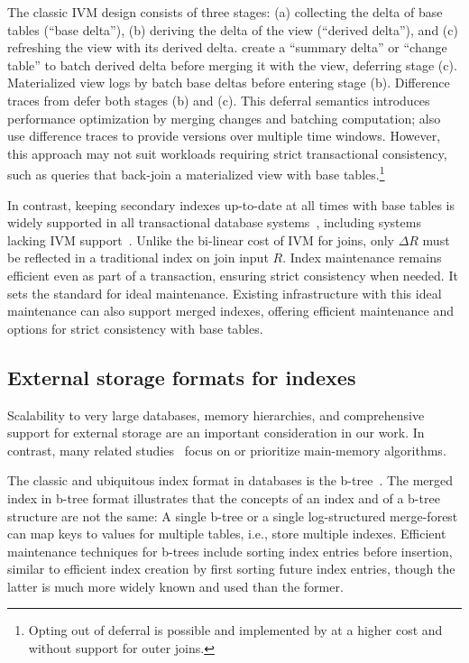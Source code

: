 \documentclass[biblatex, english]{lni}
\begin{document}
The classic IVM design consists of three stages: (a) collecting the delta of base tables (``base delta''), (b) deriving the delta of the view (``derived delta''), and (c) refreshing the view with its derived delta.
 create a ``summary delta'' or ``change table'' to batch derived delta before merging it with the view, deferring stage (c).
Materialized view logs by \citet{oracle2024mvrefresh} batch base deltas before entering stage (b).
Difference traces from \citet{mcsherry2013differentialdataflow} defer both stages (b) and (c).
This deferral semantics introduces performance optimization by merging changes and batching computation; \citet{mcsherry2013differentialdataflow} also use difference traces to provide versions over multiple time windows.
However, this approach may not suit workloads requiring strict transactional consistency, such as queries that back-join a materialized view with base tables.\footnote{
    Opting out of deferral is possible and implemented by \citet{oracle2024mvrefresh} at a higher cost and without support for outer joins.
}

In contrast, keeping secondary indexes up-to-date at all times with base tables is widely supported in all transactional database systems~\cite{oracle2024index, microsoft2024modifyindex}, including systems lacking IVM support~\cite{postgres2024index, ibm2024indexsync}.
Unlike the bi-linear cost of IVM for joins, only \(\Delta R\) must be reflected in a traditional index on join input \(R\).
Index maintenance remains efficient even as part of a transaction, ensuring strict consistency when needed.
It sets the standard for ideal maintenance.
Existing infrastructure with this ideal maintenance can also support merged indexes, offering efficient maintenance and options for strict consistency with base tables.

\subsection{External storage formats for indexes}\label{ssec:storage}

Scalability to very large databases, memory hierarchies, and comprehensive support for external storage are an important consideration in our work.
In contrast, many related studies~\cite{Idris2017DyanmicYanakakis, Berkholz2017conjunctive, mcsherry2013differentialdataflow, dbtoaster} focus on or prioritize main-memory algorithms.

The classic and ubiquitous index format in databases is the b-tree~\cite{bayer1972organization, comer1979ubiquitous, Graefe11a, Graefe24}.
The merged index in b-tree format illustrates that the concepts of an index and of a b-tree structure are not the same:
A single b-tree or a single log-structured merge-forest can map keys to values for multiple tables, i.e., store multiple indexes.
Efficient maintenance techniques for b-trees include sorting index entries before insertion, similar to efficient index creation by first sorting future index entries, though the latter is much more widely known and used than the former.
\end{document}

